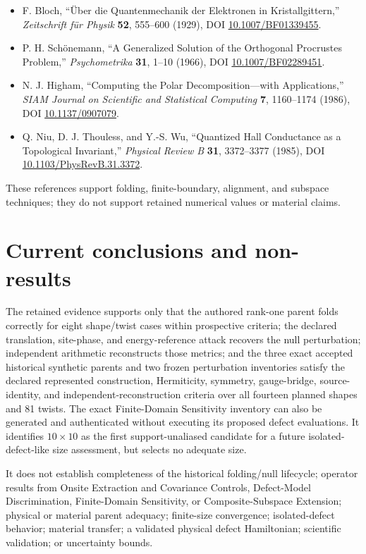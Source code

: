 \documentclass[11pt]{article}
\begin{document}
\begin{itemize}[leftmargin=*]
  \item F. Bloch, ``\"Uber die Quantenmechanik der Elektronen in
    Kristallgittern,'' \emph{Zeitschrift f\"ur Physik} \textbf{52}, 555--600
    (1929), DOI \href{https://doi.org/10.1007/BF01339455}{10.1007/BF01339455}.
  \item P. H. Sch\"onemann, ``A Generalized Solution of the Orthogonal Procrustes
    Problem,'' \emph{Psychometrika} \textbf{31}, 1--10 (1966), DOI
    \href{https://doi.org/10.1007/BF02289451}{10.1007/BF02289451}.
  \item N. J. Higham, ``Computing the Polar Decomposition---with Applications,''
    \emph{SIAM Journal on Scientific and Statistical Computing} \textbf{7},
    1160--1174 (1986), DOI
    \href{https://doi.org/10.1137/0907079}{10.1137/0907079}.
  \item Q. Niu, D. J. Thouless, and Y.-S. Wu, ``Quantized Hall Conductance as a
    Topological Invariant,'' \emph{Physical Review B} \textbf{31}, 3372--3377
    (1985), DOI
    \href{https://doi.org/10.1103/PhysRevB.31.3372}{10.1103/PhysRevB.31.3372}.
\end{itemize}
These references support folding, finite-boundary, alignment, and subspace techniques;
they do not support retained numerical values or material claims.

\section{Current conclusions and non-results}

The retained evidence supports only that the authored rank-one parent folds correctly
for eight shape/twist cases within prospective criteria; the declared translation,
site-phase, and energy-reference attack recovers the null perturbation; independent
arithmetic reconstructs those metrics; and the three exact accepted historical
synthetic parents and two frozen perturbation inventories satisfy the declared
represented construction, Hermiticity, symmetry, gauge-bridge, source-identity, and
independent-reconstruction criteria over all fourteen planned shapes and 81 twists.
The exact Finite-Domain Sensitivity inventory can also be generated and authenticated
without executing its proposed defect evaluations.  It identifies $10\times10$ as the
first support-unaliased candidate for a future isolated-defect-like size assessment,
but selects no adequate size.

It does not establish completeness of the historical folding/null lifecycle; operator
results from Onsite Extraction and Covariance Controls, Defect-Model Discrimination,
Finite-Domain Sensitivity, or Composite-Subspace Extension; physical or material parent
adequacy; finite-size convergence; isolated-defect behavior; material transfer; a
validated physical defect Hamiltonian; scientific validation; or uncertainty bounds.
\end{document}

